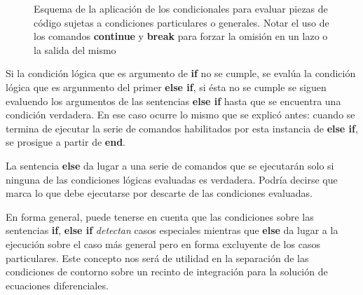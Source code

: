 \begin{figure}
  
  \caption{Esquema de la aplicación de los condicionales   para 
  evaluar piezas de código sujetas a condiciones 
  particulares o generales. Notar el uso de los comandos 
  \protect\textbf{continue} y \protect\textbf{break} para forzar la 
  omisión en un lazo o la salida del mismo
  \label{FigMatlabIf}
  }

\end{figure}

Si la condición lógica que es argumento de \textbf{if}
no se cumple, se evalúa 
la condición lógica que es argunmento del 
primer \textbf{else if}, si ésta no se cumple 
se siguen evaluendo los argumentos de las
sentencias \textbf{else if} hasta que se encuentra 
una condición verdadera. En ese caso ocurre lo 
mismo que se explicó antes: cuando se termina
de ejecutar la serie de comandos habilitados
por esta instancia de \textbf{else if}, se
prosigue a partir de \textbf{end}.

La sentencia \textbf{else} da lugar a una serie de
comandos que se ejecutarán solo si ninguna de las 
condiciones lógicas evaluadas es verdadera. 
Podría decirse que marca lo que debe ejecutarse por 
descarte de las condiciones evaluadas. 

En forma general, puede tenerse en cuenta que las 
condiciones sobre las sentencias \textbf{if}, 
\textbf{else if} \emph{ detectan} casos especiales
mientras que \textbf{else} da lugar a la ejecución
sobre el caso más general pero en forma 
excluyente de los casos particulares. Este 
concepto nos será de utilidad en la separación
de las condiciones de contorno sobre un 
recinto de integración para la solución
de ecuaciones diferenciales. 

\mode*
